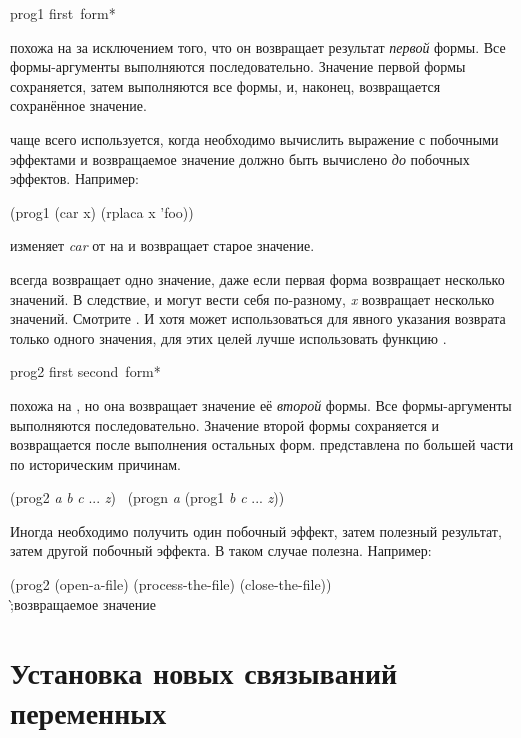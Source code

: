 \begin{defmac}
prog1 first {\,form}*

 похожа на  за исключением того, что он возвращает
результат \emph{первой} формы. Все формы-аргументы выполняются
последовательно. Значение первой формы сохраняется, затем выполняются все формы,
и, наконец, возвращается сохранённое значение.

 чаще всего используется, когда необходимо вычислить выражение с
побочными эффектами и возвращаемое значение должно быть вычислено \emph{до}
побочных эффектов.
Например:
\begin{lisp}
(prog1 (car x) (rplaca x 'foo))
\end{lisp}
изменяет \emph{car} от  на  и возвращает старое значение.

 всегда возвращает одно значение, даже если первая форма возвращает
несколько значений.
В следствие,  и  могут вести себя
по-разному, \emph{x} возвращает несколько значений. Смотрите .
И хотя  может использоваться для явного указания возврата только
одного значения, для этих целей лучше использовать функцию .
\end{defmac}

\begin{defmac}
prog2 first second {\,form}*

 похожа на , но она возвращает значение её \emph{второй}
формы. Все формы-аргументы выполняются последовательно. Значение второй формы
сохраняется и возвращается после выполнения остальных форм.
 представлена по большей части по историческим причинам.
\begin{lisp}
(prog2 \emph{a} \emph{b} \emph{c} ... \emph{z}) \EQ\ (progn \emph{a} (prog1 \emph{b} \emph{c} ... \emph{z}))
\end{lisp}
Иногда необходимо получить один побочный эффект, затем полезный результат, затем
другой побочный эффекта. В таком случае  полезна.
Например:
\begin{lisp}
(prog2 (open-a-file) (process-the-file) (close-the-file)) \\
\`;\textrm{возвращаемое значение }
\end{lisp}
\end{defmac}

\section{Установка новых связываний переменных}
\label{VAR-BINDING-SECTION}

